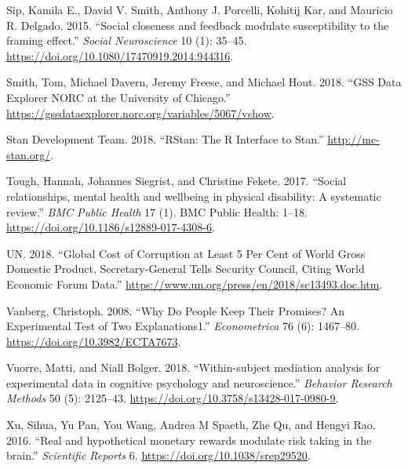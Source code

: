 \documentclass[smallextended]{svjour3}       %
\begin{document}
\leavevmode\hypertarget{ref-Sip2015}{}%
Sip, Kamila E., David V. Smith, Anthony J. Porcelli, Kohitij Kar, and
Mauricio R. Delgado. 2015. ``Social closeness and feedback modulate
susceptibility to the framing effect.'' \emph{Social Neuroscience} 10
(1): 35--45. \url{https://doi.org/10.1080/17470919.2014.944316}.

\leavevmode\hypertarget{ref-GSS2018}{}%
Smith, Tom, Michael Davern, Jeremy Freese, and Michael Hout. 2018. ``GSS
Data Explorer \textbar{} NORC at the University of Chicago.''
\url{https://gssdataexplorer.norc.org/variables/5067/vshow}.

\leavevmode\hypertarget{ref-Rstan2018}{}%
Stan Development Team. 2018. ``RStan: The R Interface to Stan.''
\url{http://mc-stan.org/}.

\leavevmode\hypertarget{ref-Tough2017}{}%
Tough, Hannah, Johannes Siegrist, and Christine Fekete. 2017. ``Social
relationships, mental health and wellbeing in physical disability: A
systematic review.'' \emph{BMC Public Health} 17 (1). BMC Public Health:
1--18. \url{https://doi.org/10.1186/s12889-017-4308-6}.

\leavevmode\hypertarget{ref-UN2018}{}%
UN. 2018. ``Global Cost of Corruption at Least 5 Per Cent of World Gross
Domestic Product, Secretary-General Tells Security Council, Citing World
Economic Forum Data.''
\url{https://www.un.org/press/en/2018/sc13493.doc.htm}.

\leavevmode\hypertarget{ref-Vanberg2008}{}%
Vanberg, Christoph. 2008. ``Why Do People Keep Their Promises? An
Experimental Test of Two Explanations1.'' \emph{Econometrica} 76 (6):
1467--80. \url{https://doi.org/10.3982/ECTA7673}.

\leavevmode\hypertarget{ref-Vuorre2018}{}%
Vuorre, Matti, and Niall Bolger. 2018. ``Within-subject mediation
analysis for experimental data in cognitive psychology and
neuroscience.'' \emph{Behavior Research Methods} 50 (5): 2125--43.
\url{https://doi.org/10.3758/s13428-017-0980-9}.

\leavevmode\hypertarget{ref-Xu2016}{}%
Xu, Sihua, Yu Pan, You Wang, Andrea M Spaeth, Zhe Qu, and Hengyi Rao.
2016. ``Real and hypothetical monetary rewards modulate risk taking in
the brain.'' \emph{Scientific Reports} 6.
\url{https://doi.org/10.1038/srep29520}.



\end{document}
